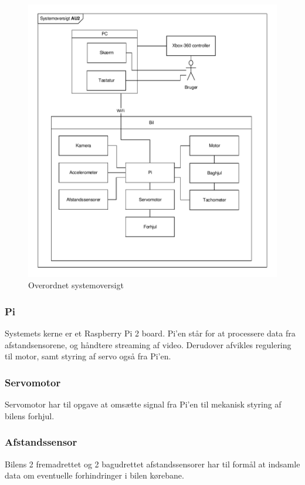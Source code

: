 \begin{figure}[h]
\centering
\includegraphics[width=\textwidth]{../fig/diagrammer/systemoversigt.pdf}
\caption{Overordnet systemoversigt}
\label{fig:systemoversigt}
\end{figure}
\clearpage

\subsubsection{Pi}
Systemets kerne er et Raspberry Pi 2 board.
Pi'en står for at processere data fra afstandsensorene, og håndtere streaming af video. Derudover afvikles regulering til motor, samt styring af servo også fra Pi'en. 

\subsubsection{Servomotor}
Servomotor har til opgave at omsætte signal fra Pi'en til mekanisk styring af bilens forhjul. 

\subsubsection{Afstandssensor}
Bilens 2 fremadrettet og 2 bagudrettet afstandssensorer har til formål at indsamle data om eventuelle forhindringer i bilen kørebane. 

